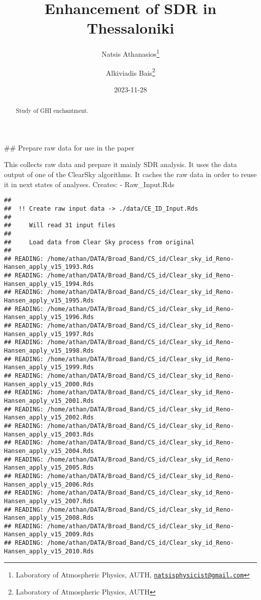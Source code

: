\documentclass[
  10pt,
  a4paper,oneside]{article}
\title{Enhancement of SDR in Thessaloniki}
\author{Natsis Athanasios\footnote{Laboratory of Atmospheric Physics, AUTH, \href{mailto:natsisphysicist@gmail.com}{\nolinkurl{natsisphysicist@gmail.com}}} \and Alkiviadis Bais\footnote{Laboratory of Atmospheric Physics, AUTH}}
\date{2023-11-28}
\begin{document}
\maketitle
\begin{abstract}
Study of GHI enchantment.
\end{abstract}

{
\hypersetup{linkcolor=}
\setcounter{tocdepth}{4}
\tableofcontents
}
\#\# Prepare raw data for use in the paper

This collects raw data and prepare it mainly SDR analysis.
It uses the data output of one of the ClearSky algorithms.
It caches the raw data in order to reuse it in next states of analyses.
Creates:
- Raw\_Input.Rds

\begin{verbatim}
## 
##  !! Create raw input data -> ./data/CE_ID_Input.Rds 
## 
##     Will read 31 input files
## 
##     Load data from Clear Sky process from original
## 
## READING: /home/athan/DATA/Broad_Band/CS_id/Clear_sky_id_Reno-Hansen_apply_v15_1993.Rds 
## READING: /home/athan/DATA/Broad_Band/CS_id/Clear_sky_id_Reno-Hansen_apply_v15_1994.Rds 
## READING: /home/athan/DATA/Broad_Band/CS_id/Clear_sky_id_Reno-Hansen_apply_v15_1995.Rds 
## READING: /home/athan/DATA/Broad_Band/CS_id/Clear_sky_id_Reno-Hansen_apply_v15_1996.Rds 
## READING: /home/athan/DATA/Broad_Band/CS_id/Clear_sky_id_Reno-Hansen_apply_v15_1997.Rds 
## READING: /home/athan/DATA/Broad_Band/CS_id/Clear_sky_id_Reno-Hansen_apply_v15_1998.Rds 
## READING: /home/athan/DATA/Broad_Band/CS_id/Clear_sky_id_Reno-Hansen_apply_v15_1999.Rds 
## READING: /home/athan/DATA/Broad_Band/CS_id/Clear_sky_id_Reno-Hansen_apply_v15_2000.Rds 
## READING: /home/athan/DATA/Broad_Band/CS_id/Clear_sky_id_Reno-Hansen_apply_v15_2001.Rds 
## READING: /home/athan/DATA/Broad_Band/CS_id/Clear_sky_id_Reno-Hansen_apply_v15_2002.Rds 
## READING: /home/athan/DATA/Broad_Band/CS_id/Clear_sky_id_Reno-Hansen_apply_v15_2003.Rds 
## READING: /home/athan/DATA/Broad_Band/CS_id/Clear_sky_id_Reno-Hansen_apply_v15_2004.Rds 
## READING: /home/athan/DATA/Broad_Band/CS_id/Clear_sky_id_Reno-Hansen_apply_v15_2005.Rds 
## READING: /home/athan/DATA/Broad_Band/CS_id/Clear_sky_id_Reno-Hansen_apply_v15_2006.Rds 
## READING: /home/athan/DATA/Broad_Band/CS_id/Clear_sky_id_Reno-Hansen_apply_v15_2007.Rds 
## READING: /home/athan/DATA/Broad_Band/CS_id/Clear_sky_id_Reno-Hansen_apply_v15_2008.Rds 
## READING: /home/athan/DATA/Broad_Band/CS_id/Clear_sky_id_Reno-Hansen_apply_v15_2009.Rds 
## READING: /home/athan/DATA/Broad_Band/CS_id/Clear_sky_id_Reno-Hansen_apply_v15_2010.Rds 

\end{verbatim}
\end{document}

